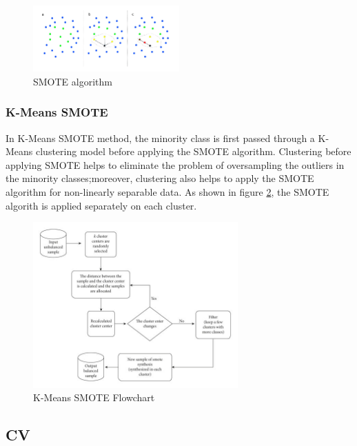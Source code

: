 \documentclass[twoside,11pt,a4paper]{article}
\begin{document}
\begin{figure}[ht]
	\centering
	\includegraphics[width=0.5\textwidth]{smote}
	\caption[\acs{SMOTE} algorithm]{\acs{SMOTE} algorithm \citep{schubachimbalance}}
	\label{fig:smote}
\end{figure}
\FloatBarrier
\subsubsection{K-Means \acs{SMOTE}}

In K-Means \acs{SMOTE} method, the minority class is first passed through a K-Means clustering model before applying the \acs{SMOTE} algorithm. Clustering before applying \acs{SMOTE} helps to eliminate the problem of oversampling the outliers in the minority classes;moreover, clustering also helps to apply the \acs{SMOTE} algorithm for non-linearly separable data. As shown in  figure \ref{fig:kmeans_smote}, the SMOTE algorith is applied separately on each cluster.\\
\begin{figure}[ht]
	\centering
	\includegraphics[width=0.7\textwidth]{kmeans_smote}
	\caption[K-Means \acs{SMOTE} algorithm]{K-Means \acs{SMOTE} Flowchart \citep{chen2021research}}
	\label{fig:kmeans_smote}
\end{figure}
\FloatBarrier
\subsection{\acf{CV}}
\end{document}
